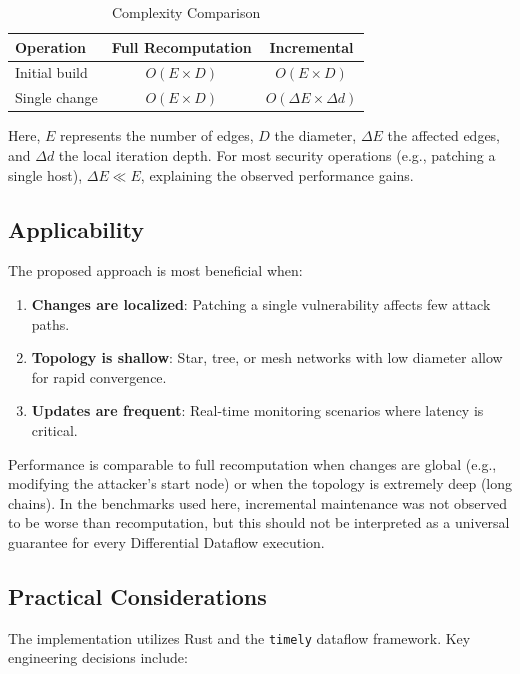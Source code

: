 \documentclass[conference]{IEEEtran}
\begin{document}
\begin{table}[H]
\centering
\caption{Complexity Comparison}
\label{tab:complexity}
\begin{tabular}{@{}lcc@{}}
\toprule
\textbf{Operation} & \textbf{Full Recomputation} & \textbf{Incremental} \\
\midrule
Initial build & $O(E \times D)$ & $O(E \times D)$ \\
Single change & $O(E \times D)$ & $O(\Delta E \times \Delta d)$ \\
\bottomrule
\end{tabular}
\end{table}

Here, $E$ represents the number of edges, $D$ the diameter, $\Delta E$ the affected edges, and $\Delta d$ the local iteration depth. For most security operations (e.g., patching a single host), $\Delta E \ll E$, explaining the observed performance gains.

\subsection{Applicability}

The proposed approach is most beneficial when:

\begin{enumerate}
    \item \textbf{Changes are localized}: Patching a single vulnerability affects few attack paths.
    \item \textbf{Topology is shallow}: Star, tree, or mesh networks with low diameter allow for rapid convergence.
    \item \textbf{Updates are frequent}: Real-time monitoring scenarios where latency is critical.
\end{enumerate}

Performance is comparable to full recomputation when changes are global (e.g.,
modifying the attacker's start node) or when the topology is extremely deep
(long chains). In the benchmarks used here, incremental maintenance was not
observed to be worse than recomputation, but this should not be interpreted as a
universal guarantee for every Differential Dataflow execution.

\subsection{Practical Considerations}

The implementation utilizes Rust and the \texttt{timely} dataflow framework. Key engineering decisions include:
\end{document}

